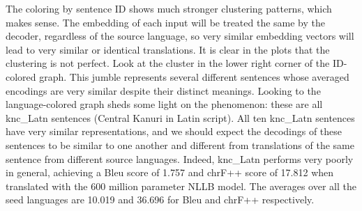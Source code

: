 The coloring by sentence ID shows much stronger clustering patterns, which makes sense. The embedding of each input will be treated the same by the decoder, regardless of the source language, so very similar embedding vectors will lead to very similar or identical translations. It is clear in the plots that the clustering is not perfect. Look at the cluster in the lower right corner of the ID-colored graph. This jumble represents several different sentences whose averaged encodings are very similar despite their distinct meanings. Looking to the language-colored graph sheds some light on the phenomenon: these are all knc\_Latn sentences (Central Kanuri in Latin script). All ten knc\_Latn sentences have very similar representations, and we should expect the decodings of these sentences to be similar to one another and different from translations of the same sentence from different source languages. Indeed, knc\_Latn performs very poorly in general, achieving a Bleu score of 1.757 and chrF++ score of 17.812 when translated with the 600 million parameter NLLB model. The averages over all the seed languages are 10.019 and 36.696 for Bleu and chrF++ respectively. 

